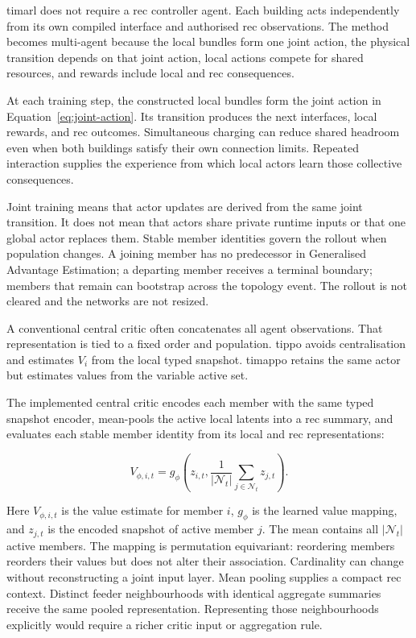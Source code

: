\gls{timarl} does not require a \gls{rec} controller agent. Each building acts independently from its own compiled interface and authorised \gls{rec} observations. The method becomes multi-agent because the local bundles form one joint action, the physical transition depends on that joint action, local actions compete for shared resources, and rewards include local and \gls{rec} consequences.

At each training step, the constructed local bundles form the joint action in Equation~\ref{eq:joint-action}. Its transition produces the next interfaces, local rewards, and \gls{rec} outcomes. Simultaneous charging can reduce shared headroom even when both buildings satisfy their own connection limits. Repeated interaction supplies the experience from which local actors learn those collective consequences.

Joint training means that actor updates are derived from the same joint transition. It does not mean that actors share private runtime inputs or that one global actor replaces them. Stable member identities govern the rollout when population changes. A joining member has no predecessor in Generalised Advantage Estimation; a departing member receives a terminal boundary; members that remain can bootstrap across the topology event. The rollout is not cleared and the networks are not resized.

\label{sec:timarl-central-critic}

A conventional central critic often concatenates all agent observations. That representation is tied to a fixed order and population. \gls{tippo} avoids centralisation and estimates $V_i$ from the local typed snapshot. \gls{timappo} retains the same actor but estimates values from the variable active set.

The implemented central critic encodes each member with the same typed snapshot encoder, mean-pools the active local latents into a \gls{rec} summary, and evaluates each stable member identity from its local and \gls{rec} representations:

\begin{equation}
V_{\phi,i,t}
=
g_{\phi}
\left(
z_{i,t},
\frac{1}{|\mathcal{N}_t|}
\sum_{j\in\mathcal{N}_t}z_{j,t}
\right).
\label{eq:graph-critic}
\end{equation}

Here $V_{\phi,i,t}$ is the value estimate for member $i$, $g_\phi$ is the learned value mapping, and $z_{j,t}$ is the encoded snapshot of active member $j$. The mean contains all $|\mathcal N_t|$ active members. The mapping is permutation equivariant: reordering members reorders their values but does not alter their association. Cardinality can change without reconstructing a joint input layer. Mean pooling supplies a compact \gls{rec} context. Distinct feeder neighbourhoods with identical aggregate summaries receive the same pooled representation. Representing those neighbourhoods explicitly would require a richer critic input or aggregation rule.

